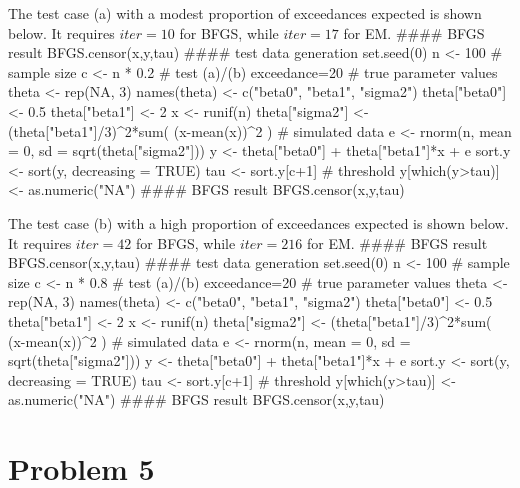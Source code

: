 \documentclass{article}
\begin{document}
The test case (a) with a modest proportion of exceedances expected is shown below. It requires $iter=10$ for BFGS, while $iter=17$ for EM.
#### BFGS result
BFGS.censor(x,y,tau)
\newpage
#### test data generation
set.seed(0)
n <- 100 # sample size
c <- n * 0.2 # test (a)/(b) exceedance=20%
# true parameter values
theta <- rep(NA, 3)
names(theta) <- c("beta0", "beta1", "sigma2")
theta["beta0"]  <- 0.5
theta["beta1"]  <- 2
x <- runif(n)
theta["sigma2"] <- (theta["beta1"]/3)^2*sum( (x-mean(x))^2 )
# simulated data
e <- rnorm(n, mean = 0, sd = sqrt(theta["sigma2"]))
y <- theta["beta0"] + theta["beta1"]*x + e
sort.y <- sort(y, decreasing = TRUE)
tau <- sort.y[c+1] # threshold
y[which(y>tau)] <- as.numeric("NA")
#### BFGS result
BFGS.censor(x,y,tau)

The test case (b) with a high proportion of exceedances expected is shown below. It requires $iter=42$ for BFGS, while $iter=216$ for EM.
#### BFGS result
BFGS.censor(x,y,tau)
#### test data generation
set.seed(0)
n <- 100 # sample size
c <- n * 0.8 # test (a)/(b) exceedance=20%
# true parameter values
theta <- rep(NA, 3)
names(theta) <- c("beta0", "beta1", "sigma2")
theta["beta0"]  <- 0.5
theta["beta1"]  <- 2
x <- runif(n)
theta["sigma2"] <- (theta["beta1"]/3)^2*sum( (x-mean(x))^2 )
# simulated data
e <- rnorm(n, mean = 0, sd = sqrt(theta["sigma2"]))
y <- theta["beta0"] + theta["beta1"]*x + e
sort.y <- sort(y, decreasing = TRUE)
tau <- sort.y[c+1] # threshold
y[which(y>tau)] <- as.numeric("NA")
#### BFGS result
BFGS.censor(x,y,tau)


\newpage
\section*{Problem 5}
\end{document}
